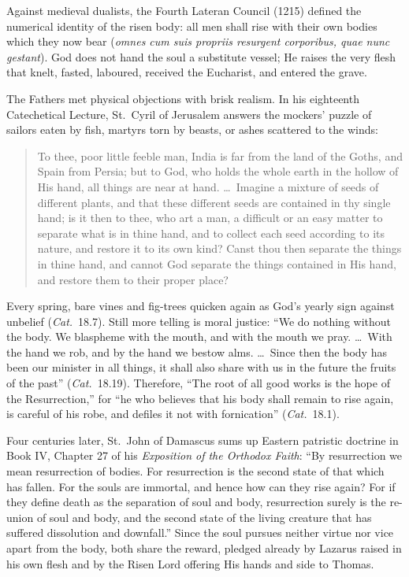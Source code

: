 Against medieval dualists, the Fourth Lateran Council (1215) defined the numerical identity of the risen body: all men shall rise with their own bodies which they now bear (\textit{omnes cum suis propriis resurgent corporibus, quae nunc gestant}). God does not hand the soul a substitute vessel; He raises the very flesh that knelt, fasted, laboured, received the Eucharist, and entered the grave.

The Fathers met physical objections with brisk realism. In his eighteenth Catechetical Lecture, St.\ Cyril of Jerusalem answers the mockers' puzzle of sailors eaten by fish, martyrs torn by beasts, or ashes scattered to the winds:

\begin{quote}
To thee, poor little feeble man, India is far from the land of the Goths, and Spain from Persia; but to God, who holds the whole earth in the hollow of His hand, all things are near at hand. \dots\ Imagine a mixture of seeds of different plants, and that these different seeds are contained in thy single hand; is it then to thee, who art a man, a difficult or an easy matter to separate what is in thine hand, and to collect each seed according to its nature, and restore it to its own kind? Canst thou then separate the things in thine hand, and cannot God separate the things contained in His hand, and restore them to their proper place?
\end{quote}

Every spring, bare vines and fig-trees quicken again as God's yearly sign against unbelief (\textit{Cat.}\ 18.7). Still more telling is moral justice: ``We do nothing without the body. We blaspheme with the mouth, and with the mouth we pray. \dots\ With the hand we rob, and by the hand we bestow alms. \dots\ Since then the body has been our minister in all things, it shall also share with us in the future the fruits of the past'' (\textit{Cat.}\ 18.19). Therefore, ``The root of all good works is the hope of the Resurrection,'' for ``he who believes that his body shall remain to rise again, is careful of his robe, and defiles it not with fornication'' (\textit{Cat.}\ 18.1).

Four centuries later, St.\ John of Damascus sums up Eastern patristic doctrine in Book IV, Chapter 27 of his \textit{Exposition of the Orthodox Faith}: ``By resurrection we mean resurrection of bodies. For resurrection is the second state of that which has fallen. For the souls are immortal, and hence how can they rise again? For if they define death as the separation of soul and body, resurrection surely is the re-union of soul and body, and the second state of the living creature that has suffered dissolution and downfall.'' Since the soul pursues neither virtue nor vice apart from the body, both share the reward, pledged already by Lazarus raised in his own flesh and by the Risen Lord offering His hands and side to Thomas.

